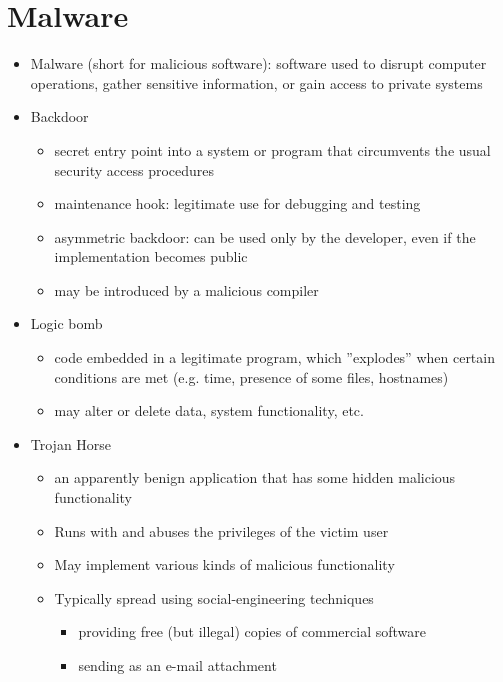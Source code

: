 \documentclass[final]{article}
\begin{document}
\section{Malware}
\begin{itemize}[nosep]
    \item Malware (short for malicious software): software used to disrupt computer operations, gather sensitive information, or gain access to private systems
    \item Backdoor
          \begin{itemize}[nosep]
              \item secret entry point into a system or program that circumvents the usual security access procedures
              \item maintenance hook: legitimate use for debugging and testing
              \item asymmetric backdoor: can be used only by the developer, even if the implementation becomes public
              \item may be introduced by a malicious compiler
          \end{itemize}
    \item Logic bomb
          \begin{itemize}[nosep]
              \item code embedded in a legitimate program, which ''explodes'' when certain conditions are met (e.g. time, presence of some files, hostnames)
              \item may alter or delete data, system functionality, etc.
          \end{itemize}
    \item Trojan Horse
          \begin{itemize}[nosep]
              \item an apparently benign application that has some hidden malicious functionality
              \item Runs with and abuses the privileges of the victim user
              \item May implement various kinds of malicious functionality
              \item Typically spread using social-engineering techniques
                    \begin{itemize}
                        \item providing free (but illegal) copies of commercial software
                        \item sending as an e-mail attachment

\end{itemize}
\end{itemize}
\end{itemize}
\end{document}
